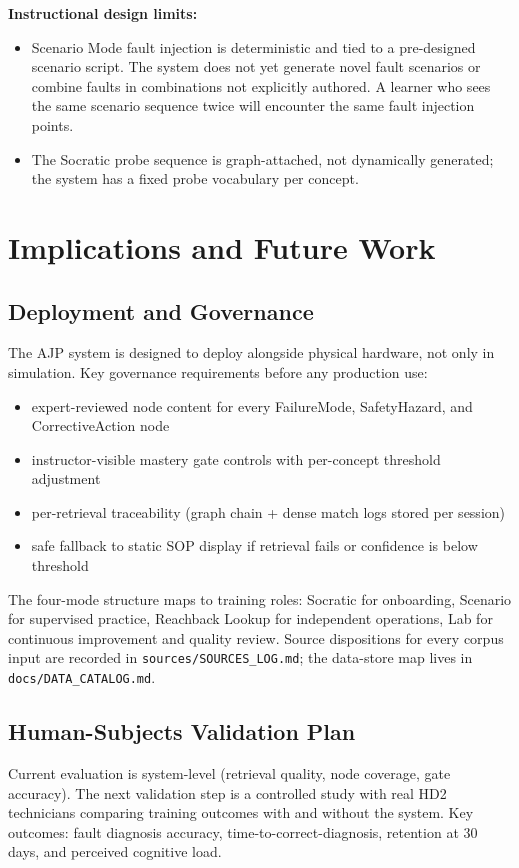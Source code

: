 \documentclass[11pt,letterpaper]{article}
\newcommand{\code}[1]{\texttt{\small #1}}
\begin{document}
\textbf{Instructional design limits:}
\begin{itemize}
  \item Scenario Mode fault injection is deterministic and tied to a pre-designed scenario script. The system does not yet generate novel fault scenarios or combine faults in combinations not explicitly authored. A learner who sees the same scenario sequence twice will encounter the same fault injection points.
  \item The Socratic probe sequence is graph-attached, not dynamically generated; the system has a fixed probe vocabulary per concept.
\end{itemize}

\section{Implications and Future Work}
\label{sec:implications}

\subsection{Deployment and Governance}
The AJP system is designed to deploy alongside physical hardware, not only in simulation. Key governance requirements before any production use:

\begin{itemize}
  \item expert-reviewed node content for every FailureMode, SafetyHazard, and CorrectiveAction node
  \item instructor-visible mastery gate controls with per-concept threshold adjustment
  \item per-retrieval traceability (graph chain + dense match logs stored per session)
  \item safe fallback to static SOP display if retrieval fails or confidence is below threshold
\end{itemize}

The four-mode structure maps to training roles: Socratic for onboarding, Scenario for supervised practice, Reachback Lookup for independent operations, Lab for continuous improvement and quality review. Source dispositions for every corpus input are recorded in \code{sources/SOURCES\_LOG.md}; the data-store map lives in \code{docs/DATA\_CATALOG.md}.

\subsection{Human-Subjects Validation Plan}
Current evaluation is system-level (retrieval quality, node coverage, gate accuracy). The next validation step is a controlled study with real HD2 technicians comparing training outcomes with and without the system. Key outcomes: fault diagnosis accuracy, time-to-correct-diagnosis, retention at 30 days, and perceived cognitive load.
\end{document}
